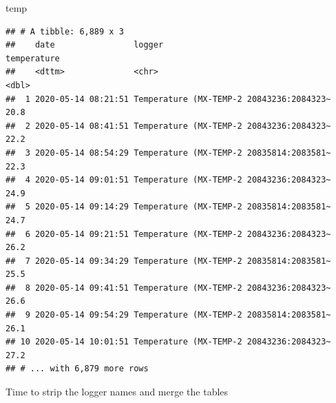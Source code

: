 \documentclass[]{article}
\newenvironment{Shaded}{\begin{snugshade}}{\end{snugshade}}
\newcommand{\DataTypeTok}[1]{\textcolor[rgb]{0.13,0.29,0.53}{#1}}
\newcommand{\KeywordTok}[1]{\textcolor[rgb]{0.13,0.29,0.53}{\textbf{#1}}}
\newcommand{\NormalTok}[1]{#1}
\newcommand{\OperatorTok}[1]{\textcolor[rgb]{0.81,0.36,0.00}{\textbf{#1}}}
\newcommand{\StringTok}[1]{\textcolor[rgb]{0.31,0.60,0.02}{#1}}
\begin{document}
\begin{Shaded}
\begin{Highlighting}[]
\NormalTok{temp}
\end{Highlighting}
\end{Shaded}

\begin{verbatim}
## # A tibble: 6,889 x 3
##    date                logger                                   temperature
##    <dttm>              <chr>                                          <dbl>
##  1 2020-05-14 08:21:51 Temperature (MX-TEMP-2 20843236:2084323~        20.8
##  2 2020-05-14 08:41:51 Temperature (MX-TEMP-2 20843236:2084323~        22.2
##  3 2020-05-14 08:54:29 Temperature (MX-TEMP-2 20835814:2083581~        22.3
##  4 2020-05-14 09:01:51 Temperature (MX-TEMP-2 20843236:2084323~        24.9
##  5 2020-05-14 09:14:29 Temperature (MX-TEMP-2 20835814:2083581~        24.7
##  6 2020-05-14 09:21:51 Temperature (MX-TEMP-2 20843236:2084323~        26.2
##  7 2020-05-14 09:34:29 Temperature (MX-TEMP-2 20835814:2083581~        25.5
##  8 2020-05-14 09:41:51 Temperature (MX-TEMP-2 20843236:2084323~        26.6
##  9 2020-05-14 09:54:29 Temperature (MX-TEMP-2 20835814:2083581~        26.1
## 10 2020-05-14 10:01:51 Temperature (MX-TEMP-2 20843236:2084323~        27.2
## # ... with 6,879 more rows
\end{verbatim}

Time to strip the logger names and merge the tables

\begin{Shaded}
\end{Shaded}
\end{document}
